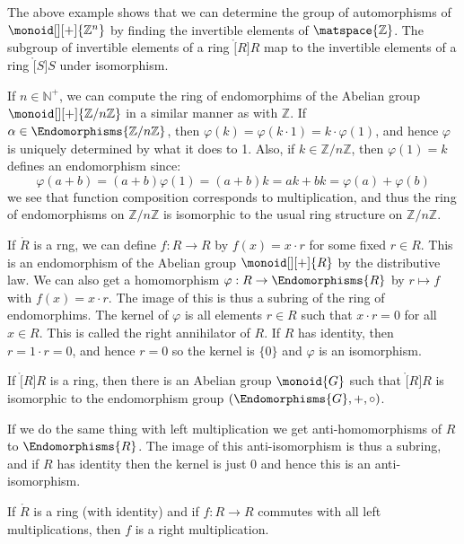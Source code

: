             The above example shows that we can determine the group of
            automorphisms of $\monoid[][+]{\mathbb{Z}^{n}}$ by finding the
            invertible elements of $\matspace{\mathbb{Z}}$. The subgroup of
            invertible elements of a ring $\ring[R]{R}$ map to the
            invertible elements of a ring $\ring[S]{S}$ under isomorphism.
            \begin{example}
                If $n\in\mathbb{N}^{+}$, we can compute the ring of
                endomorphims of the Abelian group
                $\monoid[][+]{\mathbb{Z}/n\mathbb{Z}}$ in a similar manner
                as with $\mathbb{Z}$. If
                $\alpha\in\Endomorphisms{\mathbb{Z}/n\mathbb{Z}}$, then
                $\varphi(k)=\varphi(k\cdot{1})=k\cdot\varphi(1)$, and hence
                $\varphi$ is uniquely determined by what it does to 1. Also,
                if $k\in\mathbb{Z}/n\mathbb{Z}$, then $\varphi(1)=k$ defines
                an endomorphism since:
                \begin{equation}
                    \varphi(a+b)=(a+b)\varphi(1)
                        =(a+b)k
                        =ak+bk
                        =\varphi(a)+\varphi(b)
                \end{equation}
                we see that function composition corresponds to
                multiplication, and thus the ring of endomorphisms on
                $\mathbb{Z}/n\mathbb{Z}$ is isomorphic to the usual ring
                structure on $\mathbb{Z}/n\mathbb{Z}$.
            \end{example}
            If $\ring{R}$ is a rng, we can define $f:R\rightarrow{R}$ by
            $f(x)=x\cdot{r}$ for some fixed $r\in{R}$. This is an
            endomorphism of the Abelian group $\monoid[][+]{R}$ by the
            distributive law. We can also get a homomorphism
            $\varphi:R\rightarrow\Endomorphisms{R}$ by
            $r\mapsto{f}$ with $f(x)=x\cdot{r}$. The image of this is thus
            a subring of the ring of endomorphims. The kernel of $\varphi$
            is all elements $r\in{R}$ such that $x\cdot{r}=0$ for all
            $x\in{R}$. This is called the right annihilator of $R$. If $R$
            has identity, then $r=1\cdot{r}=0$, and hence $r=0$ so the
            kernel is $\{0\}$ and $\varphi$ is an isomorphism.
            \begin{theorem}
                If $\ring[R]{R}$ is a ring, then there is an Abelian group
                $\monoid{G}$ such that $\ring[R]{R}$ is isomorphic to the
                endomorphism group $(\Endomorphisms{G},+,\circ)$.
            \end{theorem}
            If we do the same thing with left multiplication we get
            anti-homomorphisms of $R$ to $\Endomorphisms{R}$. The image of
            this anti-isomorphism is thus a subring, and if $R$ has identity
            then the kernel is just $0$ and hence this is an
            anti-isomorphism.
            \begin{theorem}
                If $\ring{R}$ is a ring (with identity) and if
                $f:R\rightarrow{R}$ commutes with all left multiplications,
                then $f$ is a right multiplication.
            \end{theorem}
